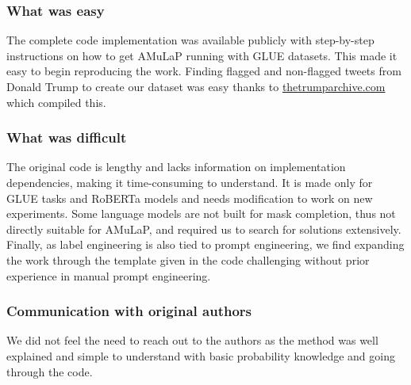 \subsubsection*{What was easy}

The complete code implementation was available publicly with step-by-step instructions on how to get AMuLaP running with GLUE datasets. This made it easy to begin reproducing the work. Finding flagged and non-flagged tweets from Donald Trump to create our dataset was easy thanks to \url{thetrumparchive.com} which compiled this.

\subsubsection*{What was difficult}

The original code is lengthy and lacks information on implementation dependencies, making it time-consuming to understand. It is made only for GLUE tasks and RoBERTa models and needs modification to work on new experiments. Some language models are not built for mask completion, thus not directly suitable for AMuLaP, and required us to search for solutions extensively. Finally, as label engineering is also tied to prompt engineering, we find expanding the work through the template given in the code challenging without prior experience in manual prompt engineering.


\subsubsection*{Communication with original authors}

We did not feel the need to reach out to the authors as the method was well explained and simple to understand with basic probability knowledge and going through the code.